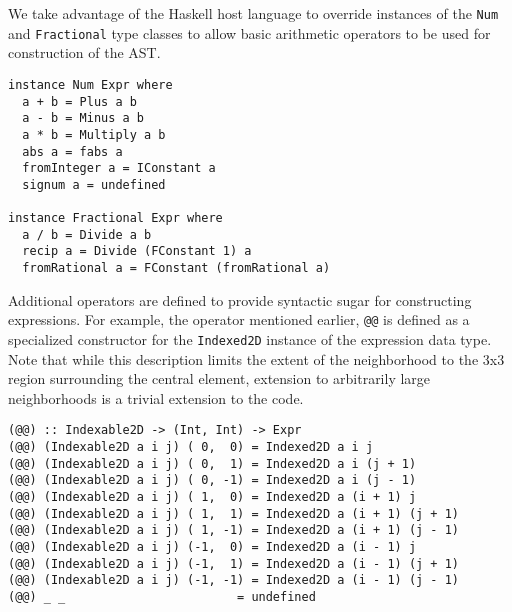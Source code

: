 We take advantage of the Haskell host language to override instances of the {\tt Num}
and {\tt Fractional} type classes to allow basic arithmetic operators to be used for
construction of the AST.

\begin{lstlisting}
instance Num Expr where
  a + b = Plus a b
  a - b = Minus a b
  a * b = Multiply a b
  abs a = fabs a
  fromInteger a = IConstant a
  signum a = undefined

instance Fractional Expr where
  a / b = Divide a b
  recip a = Divide (FConstant 1) a
  fromRational a = FConstant (fromRational a)
\end{lstlisting}

Additional operators are defined to provide syntactic sugar for constructing expressions.  For example, the operator mentioned earlier, {\tt @@} is defined as a specialized
constructor for the {\tt Indexed2D} instance of the expression data type.  Note that
while this description limits the extent of the neighborhood to the 3x3 region
surrounding the central element, extension to arbitrarily large neighborhoods is a
trivial extension to the code.

\begin{lstlisting}
(@@) :: Indexable2D -> (Int, Int) -> Expr
(@@) (Indexable2D a i j) ( 0,  0) = Indexed2D a i j
(@@) (Indexable2D a i j) ( 0,  1) = Indexed2D a i (j + 1)
(@@) (Indexable2D a i j) ( 0, -1) = Indexed2D a i (j - 1)
(@@) (Indexable2D a i j) ( 1,  0) = Indexed2D a (i + 1) j
(@@) (Indexable2D a i j) ( 1,  1) = Indexed2D a (i + 1) (j + 1)
(@@) (Indexable2D a i j) ( 1, -1) = Indexed2D a (i + 1) (j - 1)
(@@) (Indexable2D a i j) (-1,  0) = Indexed2D a (i - 1) j
(@@) (Indexable2D a i j) (-1,  1) = Indexed2D a (i - 1) (j + 1)
(@@) (Indexable2D a i j) (-1, -1) = Indexed2D a (i - 1) (j - 1)
(@@) _ _                        = undefined
\end{lstlisting}

